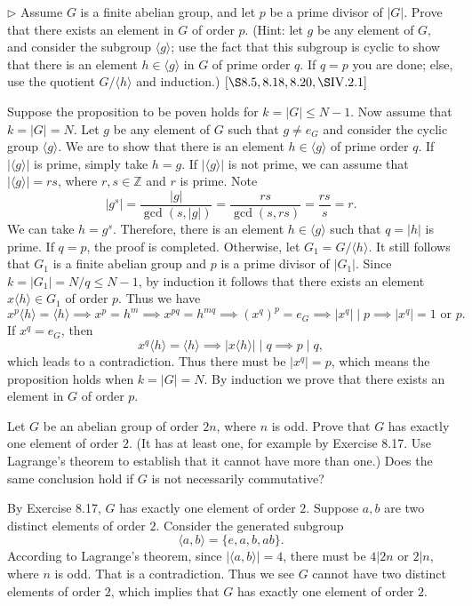 \documentclass[12pt,letterpaper,boxed]{hmcpset}
\begin{document}
\begin{problem}[8.17]
$\triangleright$ Assume $G$ is a finite abelian group, and let $p$ be a prime divisor of $|G| .$ Prove that there exists an element in $G$ of order $p$. (Hint: let $g$ be any element of $G,$ and consider the subgroup $\langle g\rangle$; use the fact that this subgroup is cyclic to show that there is an element $h \in\langle g\rangle$ in $G$ of prime order $q .$ If $q=p$ you are done; else, use the quotient $G /\langle h\rangle$ and induction.) $[\S 8.5,8.18,8.20, \S \mathrm{IV} .2 .1]$
\end{problem}
\begin{solution}
Suppose the proposition to be poven holds for $k=|G|\le N-1$. Now assume that $k=|G|=N$. Let $g$ be any element of $G$ such that $g\ne e_G$ and consider the cyclic group $\langle g\rangle$. We are to show that there is an element $h \in\langle g\rangle$ of prime order $q$. If $|\langle g\rangle|$ is prime, simply take $h=g$. If $|\langle g\rangle|$ is not prime, we can assume that $|\langle g\rangle|=rs$, where $r,s\in\mathbb{Z}$ and $r$ is prime. Note
\[
\left|g^{s}\right|=\frac{|g|}{\operatorname{gcd}(s,|g|)}=\frac{rs}{\operatorname{gcd}(s,rs)}=\frac{rs}{s}=r.
\]
We can take $h=g^{s}$. Therefore, there is an element $h \in\langle g\rangle$ such that $q=|h|$ is prime. If $q=p$, the proof is completed. Otherwise, let $G_1=G /\langle h\rangle$. It still follows that $G_1$ is a finite abelian group and $p$ is a prime divisor of $|G_1|$. Since $k=|G_1|=N/q\le N-1$, by induction it follows that there exists an element $x\langle h\rangle\in G_1$ of order $p$. Thus we have
\[
x^p\langle h\rangle=\langle h\rangle\implies x^p=h^m\implies x^{pq}=h^{mq} \implies (x^{q})^p=e_G\implies |x^{q}|\mid p\implies|x^{q}|=1\text{ or }p.
\]
If $x^{q}=e_G$, then 
$$
x^{q}\langle h\rangle=\langle h\rangle\implies|x\langle h\rangle|\mid q\implies p\mid q,
$$
which leads to a contradiction. Thus there must be $|x^{q}|=p$, which means the proposition holds when $k=|G|=N$. By induction we prove that there exists an element in $G$ of order $p$.

\end{solution}

\begin{problem}[8.18]
Let $G$ be an abelian group of order $2 n$, where $n$ is odd. Prove that $G$ has exactly one element of order $2 .$ (It has at least one, for example by Exercise 8.17. Use Lagrange's theorem to establish that it cannot have more than one.) Does the same conclusion hold if $G$ is not necessarily commutative?
\end{problem}
\begin{solution}
By Exercise 8.17, $G$ has exactly one element of order $2$. Suppose $a,b$ are two distinct elements of order $2$. Consider the generated subgroup 
$$
\langle a,b\rangle=\{e,a,b,ab\}.
$$
According to Lagrange's theorem, since $|\langle a,b\rangle|=4$, there must be $4|2n$ or $2|n$, where $n$ is odd. That is a contradiction. Thus we see $G$ cannot have two distinct elements of order $2$, which implies that $G$ has exactly one element of order $2$.

\end{solution}
\end{document}
